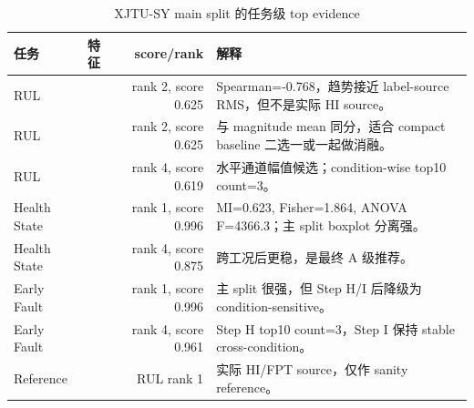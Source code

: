\begin{table}[htbp]
\centering
\caption{XJTU-SY main split 的任务级 top evidence}
\label{tab:xjtu_feature_evidence}
\scriptsize
\begin{tabularx}{\textwidth}{llrY}
\toprule
任务 & 特征 & score/rank & 解释 \\
\midrule
RUL &  & rank 2, score 0.625 & Spearman=-0.768，趋势接近 label-source RMS，但不是实际 HI source。\\
RUL &  & rank 2, score 0.625 & 与 magnitude mean 同分，适合 compact baseline 二选一或一起做消融。\\
RUL &  & rank 4, score 0.619 & 水平通道幅值候选；condition-wise top10 count=3。\\
Health State &  & rank 1, score 0.996 & MI=0.623, Fisher=1.864, ANOVA F=4366.3；主 split boxplot 分离强。\\
Health State &  & rank 4, score 0.875 & 跨工况后更稳，是最终 A 级推荐。\\
Early Fault &  & rank 1, score 0.996 & 主 split 很强，但 Step H/I 后降级为 condition-sensitive。\\
Early Fault &  & rank 4, score 0.961 & Step H top10 count=3，Step I 保持 stable cross-condition。\\
Reference &  & RUL rank 1 & 实际 HI/FPT source，仅作 sanity reference。\\
\bottomrule
\end{tabularx}
\end{table}
